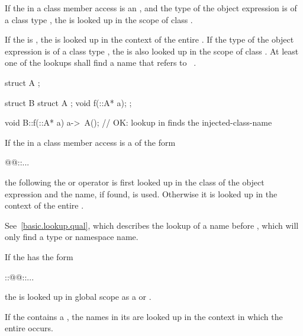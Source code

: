 \pnum
If the  in a class member
access is an , and the type of
the object expression is of a class type , the
 is looked up
in the scope of class .

\pnum
If the  is \tcode{\~}, the
 is looked up in the context of the entire
. If the type  of the object
expression is of a class type , the  is
also looked up in the scope of class . At least one of the
lookups shall find a name that refers to \cv{}~. \begin{example}

\begin{codeblock}
struct A { };

struct B {
  struct A { };
  void f(::A* a);
};

void B::f(::A* a) {
  a->~A();                      // OK: lookup in  finds the injected-class-name
}
\end{codeblock}\end{example}

\pnum
If the  in a class member access is a
 of the form
\begin{codeblock}
@@::...
\end{codeblock}
the  following the  or
\tcode{->} operator is
first looked up in the class of the object expression
and the name, if found,
is used. Otherwise it is looked up in the context of the entire
. \begin{note} See~\ref{basic.lookup.qual}, which
describes the lookup of a name before \tcode{::}, which will only find a type
or namespace name. \end{note}

\pnum
If the  has the form
\begin{codeblock}
::@@::...
\end{codeblock}
the  is looked up in global scope
as a  or .

\pnum
If the  contains a
, the names in its
 are looked up in the context in which the
entire  occurs.

